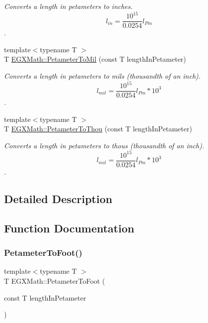 \begin{DoxyCompactItemize}
\begin{DoxyCompactList}\small\item\em Converts a length in petameters to inches. \[ l_{in}= \frac{10^{15}}{0.0254} l_{Pm} \]. \end{DoxyCompactList}\item 
{\footnotesize template$<$typename T $>$ }\\T \mbox{\hyperlink{group___e_g_x_math-_conversions-_length_conversions-_s_i-_petameter-_imperial_ga044a0e99c9e8335dc196daf1efb9c90f}{E\+G\+X\+Math\+::\+Petameter\+To\+Mil}} (const T length\+In\+Petameter)
\begin{DoxyCompactList}\small\item\em Converts a length in petameters to mils (thousandth of an inch). \[ l_{mil}= \frac{10^{15}}{0.0254} l_{Pm} * 10^{3} \]. \end{DoxyCompactList}\item 
{\footnotesize template$<$typename T $>$ }\\T \mbox{\hyperlink{group___e_g_x_math-_conversions-_length_conversions-_s_i-_petameter-_imperial_gadcb69779fdf2696d6b9e13e2b23e6216}{E\+G\+X\+Math\+::\+Petameter\+To\+Thou}} (const T length\+In\+Petameter)
\begin{DoxyCompactList}\small\item\em Converts a length in petameters to thous (thousandth of an inch). \[ l_{mil}= \frac{10^{15}}{0.0254} l_{Pm} * 10^{3} \]. \end{DoxyCompactList}\end{DoxyCompactItemize}


\subsection{Detailed Description}


\subsection{Function Documentation}
\mbox{\label{group___e_g_x_math-_conversions-_length_conversions-_s_i-_petameter-_imperial_gab1b79668a9de6a8374601bb44dde250d}} 
\subsubsection{\texorpdfstring{Petameter\+To\+Foot()}{PetameterToFoot()}}
{\footnotesize\ttfamily template$<$typename T $>$ \\
T E\+G\+X\+Math\+::\+Petameter\+To\+Foot (\begin{DoxyParamCaption}\item[{const T}]{length\+In\+Petameter }\end{DoxyParamCaption})}



